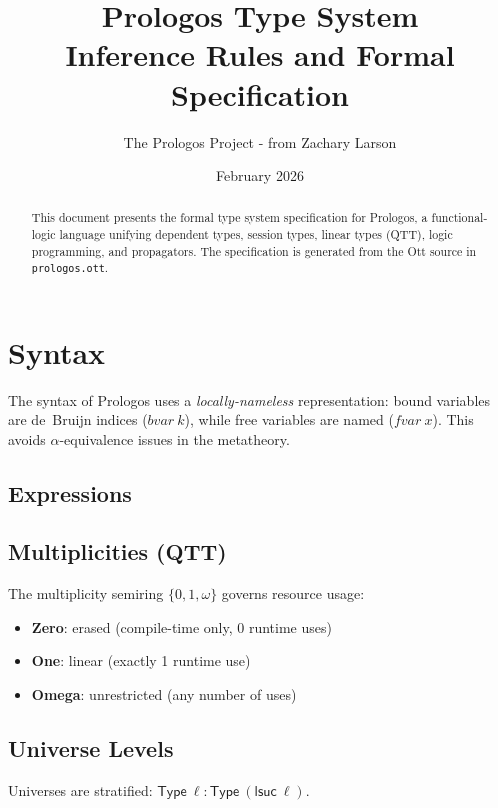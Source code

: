 \documentclass[11pt]{article}
\title{Prologos Type System\\[0.3em]
\large Inference Rules and Formal Specification}
\author{The Prologos Project - from Zachary Larson}
\date{February 2026}
\begin{document}
\maketitle

\begin{abstract}
This document presents the formal type system specification for Prologos,
a functional-logic language unifying dependent types, session types,
linear types (QTT), logic programming, and propagators. The specification
is generated from the Ott source in \texttt{prologos.ott}.
\end{abstract}

\tableofcontents
\newpage

\section{Syntax}

The syntax of Prologos uses a \emph{locally-nameless} representation:
bound variables are de~Bruijn indices ($\mathit{bvar}~k$), while free
variables are named ($\mathit{fvar}~x$). This avoids $\alpha$-equivalence
issues in the metatheory.

\subsection{Expressions}


\subsection{Multiplicities (QTT)}

The multiplicity semiring $\{0, 1, \omega\}$ governs resource usage:
\begin{itemize}
  \item \textbf{Zero}: erased (compile-time only, 0 runtime uses)
  \item \textbf{One}: linear (exactly 1 runtime use)
  \item \textbf{Omega}: unrestricted (any number of uses)
\end{itemize}


\subsection{Universe Levels}

Universes are stratified: $\mathsf{Type}~\ell : \mathsf{Type}~(\mathsf{lsuc}~\ell)$.
\end{document}
